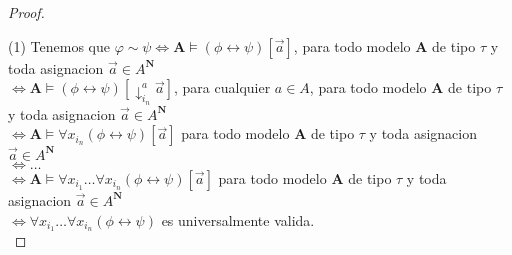 \begin{proof}
  $  $

  (1) Tenemos que $\varphi\sim\psi \iff \mathbf{A}\models(\phi\leftrightarrow\psi)[\vec{a}]$, para todo modelo $\mathbf{A}$ de tipo $\tau$ y toda asignacion $\vec{a}\in A^\mathbf{N}$\\
  $\iff \mathbf{A}\models(\phi\leftrightarrow\psi)[\downarrow_{i_n}^a\vec{a}]$, para cualquier $a \in A$, para todo modelo $\mathbf{A}$ de tipo $\tau$ y toda asignacion $\vec{a}\in A^\mathbf{N}$\\
  $\iff \mathbf{A}\models\forall x_{i_n}(\phi\leftrightarrow\psi)[\vec{a}]$ para todo modelo $\mathbf{A}$ de tipo $\tau$ y toda asignacion $\vec{a}\in A^\mathbf{N}$\\
  $\iff \dots$\\
  $\iff \mathbf{A}\models\forall x_{i_1} \dots \forall x_{i_n}(\phi\leftrightarrow\psi)[\vec{a}]$ para todo modelo $\mathbf{A}$ de tipo $\tau$ y toda asignacion $\vec{a}\in A^\mathbf{N}$\\
  $\iff \forall x_{i_1} \dots \forall x_{i_n}(\phi\leftrightarrow\psi)$ es universalmente valida.\\
  

\end{proof}
